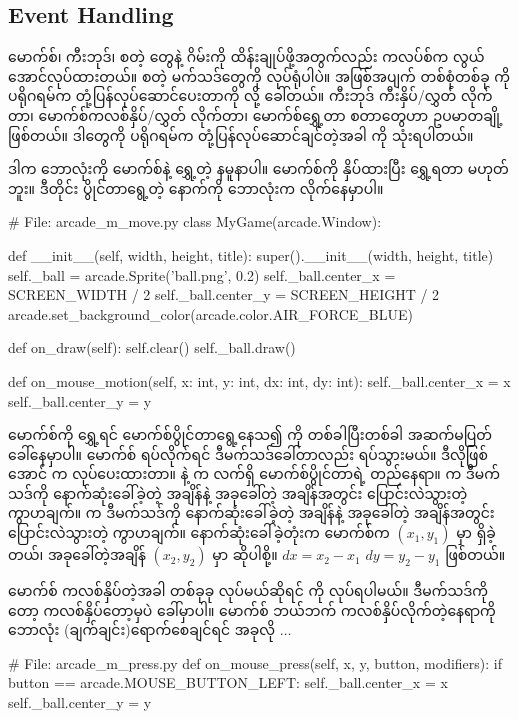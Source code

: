 \subsection*{Event Handling}
မောက်စ်၊ ကီးဘုဒ်၊  စတဲ့  တွေနဲ့ ဂိမ်းကို ထိန်းချုပ်ဖို့အတွက်လည်း  ကလပ်စ်က လွယ်အောင်လုပ်ထားတယ်။ \fEn{,} \fEn{,}  စတဲ့ မက်သဒ်တွေကို  လုပ်ရုံပါပဲ။ အဖြစ်အပျက် တစ်စုံတစ်ခု  ကို ပရိုဂရမ်က တုံ့ပြန်လုပ်ဆောင်‌ပေးတာကို  လို့ ခေါ်တယ်။ ကီးဘုဒ် ကီးနှိပ်/လွှတ် လိုက်တာ၊ မောက်စ်ကလစ်နှိပ်/လွှတ် လိုက်တာ၊ မောက်စ်ရွှေ့တာ စတာတွေဟာ  ဥပမာတချို့ ဖြစ်တယ်။ ဒါတွေကို ပရိုဂရမ်က တုံ့ပြန်လုပ်ဆောင်ချင်တဲ့အခါ  ကို သုံးရပါတယ်။

ဒါက ဘောလုံးကို မောက်စ်နဲ့ ရွှေ့တဲ့ နမူနာပါ။ မောက်စ်ကို နှိပ်ထားပြီး ရွှေ့ရတာ  မဟုတ်ဘူး။ ဒီတိုင်း ပွိုင်တာရွေ့တဲ့ နောက်ကို ဘောလုံးက လိုက်နေမှာပါ။
%
\begin{py}
# File: arcade_m_move.py
class MyGame(arcade.Window):

    def __init__(self, width, height, title):
        super().__init__(width, height, title)
        self._ball = arcade.Sprite('ball.png', 0.2)
        self._ball.center_x = SCREEN_WIDTH / 2
        self._ball.center_y = SCREEN_HEIGHT / 2
        arcade.set_background_color(arcade.color.AIR_FORCE_BLUE)

    def on_draw(self):
        self.clear()
        self._ball.draw()

    def on_mouse_motion(self, x: int, y: int, dx: int, dy: int):
        self._ball.center_x = x
        self._ball.center_y = y
\end{py}
%
မောက်စ်ကို ရွှေ့ရင် မောက်စ်ပွိုင်တာရွေ့နေသ၍  ကို တစ်ခါပြီးတစ်ခါ အဆက်မပြတ် ခေါ်နေမှာပါ။ မောက်စ် ရပ်လိုက်ရင် ဒီမက်သဒ်ခေါ်တာလည်း ရပ်သွားမယ်။ ဒီလိုဖြစ်အောင်  က လုပ်ပေးထားတာ။  နဲ့  က လက်ရှိ မောက်စ်ပွိုင်တာရဲ့ တည်နေရာ။  က ဒီမက်သဒ်ကို နောက်ဆုံးခေါ်ခဲ့တဲ့ အချိန်နဲ့ အခုခေါ်တဲ့ အချိန်အတွင်း ပြောင်းလဲသွားတဲ့  ကွာဟချက်။  က ဒီမက်သဒ်ကို နောက်ဆုံးခေါ်ခဲ့တဲ့ အချိန်နဲ့ အခုခေါ်တဲ့ အချိန်အတွင်း ပြောင်းလဲသွားတဲ့  ကွာဟချက်။ နောက်ဆုံးခေါ်ခဲ့တုံးက မောက်စ်က $(x_1, y_1)$ မှာ ရှိခဲ့တယ်၊ အခုခေါ်တဲ့အချိန် $(x_2, y_2)$ မှာ ဆိုပါစို့။  $dx= x_2 - x_1$\fEn{,} $dy= y_2 - y_1$ ဖြစ်တယ်။

မောက်စ် ကလစ်နှိပ်တဲ့အခါ တစ်ခုခု လုပ်မယ်ဆိုရင်  ကို  လုပ်ရပါမယ်။ ဒီမက်သဒ်ကိုတော့ ကလစ်နှိပ်တော့မှပဲ ခေါ်မှာပါ။  မောက်စ် ဘယ်ဘက် ကလစ်နှိပ်လိုက်တဲ့နေရာကို ဘောလုံး (ချက်ချင်း)ရောက်စေချင်ရင် အခုလို $\ldots$
%
\begin{py}
# File: arcade_m_press.py
def on_mouse_press(self, x, y, button, modifiers):
    if button == arcade.MOUSE_BUTTON_LEFT:
        self._ball.center_x = x
        self._ball.center_y = y
\end{py}
%

